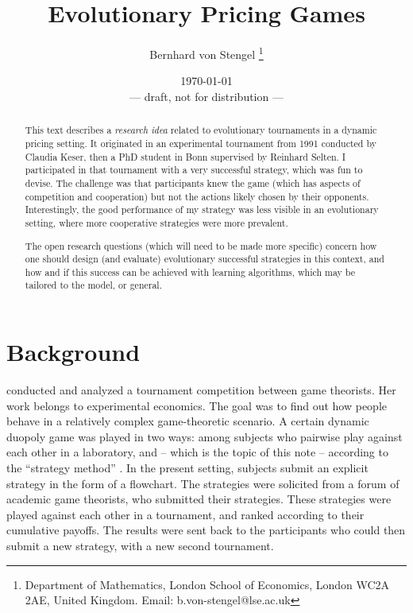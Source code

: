 \documentclass[a4paper,12pt]{article}  %
\title{%
Evolutionary Pricing Games
}
\author{
Bernhard von Stengel%
\thanks{Department of Mathematics,
London School of Economics, London WC2A 2AE, United Kingdom.
Email:  b.von-stengel@lse.ac.uk}
}
\date{\today
\\[1ex]
--- draft, not for distribution ---
}
\theoremstyle{definition}
\begin{document}
\maketitle

\begin{abstract}
This text describes a \textit{research idea} related to evolutionary
tournaments in a dynamic pricing setting. It originated in 
an experimental tournament from 1991 conducted by Claudia
Keser, then a PhD student in Bonn supervised by Reinhard
Selten. I participated in that tournament with a very
successful strategy, which was fun to devise.
The challenge was that participants knew the game (which has
aspects of competition and cooperation) but not the actions
likely chosen by their opponents.
Interestingly, the good performance of my strategy was less
visible in an evolutionary setting, where more cooperative
strategies were more prevalent.

The open research questions (which will need to be made more
specific) concern how one should design (and evaluate)
evolutionary successful strategies in this context, and how
and if this success can be achieved with learning algorithms,
which may be tailored to the model, or general.

% 
% 
% 
% 
% 
% 
% 
% 
\end{abstract}

\section{Background}

\citet{Keser1992} conducted and analyzed a tournament competition
between game theorists. Her work belongs to experimental
economics.
The goal was to find out how people behave in a relatively
complex game-theoretic scenario.
A certain dynamic duopoly game was played
in two ways: among subjects who pairwise play against each
other in a laboratory, and -- which is the topic of this note
-- according to the ``strategy method''
\citep[see][]{brandts2011}.
In the present setting, subjects submit an explicit strategy
in the form of a flowchart.
The strategies were solicited from a forum of academic game
theorists, who submitted their strategies. These strategies
were played
against each other in a tournament, and ranked according to
their cumulative payoffs. The results were sent back to the
participants who could then submit a new strategy, with a
new second tournament.
\end{document}
